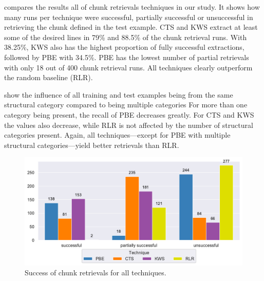  compares the results all of chunk
retrievals techniques in our study.
It shows how many runs per technique were successful, partially
successful or unsuccessful in retrieving the chunk defined in the
test example.
CTS and KWS
extract at least some of the desired lines in 79\% and 88.5\%
of the chunk retrieval runs.
With 38.25\%, KWS also has the highest proportion of fully
successful extractions, followed by PBE with 34.5\%.
PBE has the
lowest number of partial retrievals with only 18 out of 400 chunk
retrieval runs.
All techniques clearly outperform the random baseline (RLR).

show the influence of all training and test examples being from the
same structural category compared to being multiple categories
For more
than one category being present, the recall of PBE decreases greatly.
For CTS and KWS the values also decrease, while RLR is not affected by
the number of structural categories present.
Again, all techniques---except for PBE with multiple structural
categories---yield better retrievals than RLR.

\begin{figure}[!t]
		\centering
		\includegraphics[width=\columnwidth,
		clip]{img/big-study/success-partial-all.pdf}
		\caption{Success of chunk retrievals for all techniques.}
		\label{fig:success-partial-all}
\end{figure}

